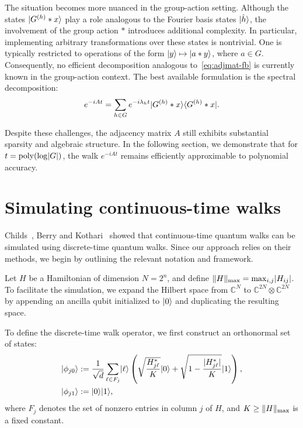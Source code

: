 \documentclass[12pt]{report}
\begin{document}
The situation becomes more nuanced in the group-action setting. Although the states \( \lvert G^{(h)} * x\rangle \) play a role analogous to the Fourier basis states \( \lvert\hat{h}\rangle \), the involvement of the group action \( * \) introduces additional complexity. In particular, implementing arbitrary transformations over these states is nontrivial. One is typically restricted to operations of the form \( \lvert y\rangle \mapsto \lvert a * y\rangle \), where \( a \in G \). Consequently, no efficient decomposition analogous to~\eqref{eq:adjmat-fb} is currently known in the group-action context. The best available formulation is the spectral decomposition:
\[
e^{-iAt} = \sum_{h \in G} e^{-i\lambda_h t} \lvert G^{(h)} * x\rangle \langle G^{(h)} * x\rvert.
\]

Despite these challenges, the adjacency matrix \( A \) still exhibits substantial sparsity and algebraic structure. In the following section, we demonstrate that for \( t = \operatorname{poly}(\log \lvert G\rvert) \), the walk \( e^{-iAt} \) remains efficiently approximable to polynomial accuracy.




\section{Simulating continuous-time walks}
Childs~\cite{Childs2004}, Berry and Kothari~\cite{BerryKothari} showed that continuous-time quantum walks can be simulated using discrete-time quantum walks. Since our approach relies on their methods, we begin by outlining the relevant notation and framework.

Let \( H \) be a Hamiltonian of dimension \( N = 2^n \), and define \( \lVert H\rVert_{\mathrm{max}} = \max_{i, j} \lvert H_{ij}\rvert \). To facilitate the simulation, we expand the Hilbert space from \( \mathbb{C}^N \) to \( \mathbb{C}^{2N} \otimes \mathbb{C}^{2N} \) by appending an ancilla qubit initialized to \( \lvert0\rangle \) and duplicating the resulting space.

To define the discrete-time walk operator, we first construct an orthonormal set of states:
\begin{align}
    \lvert\phi_{j0}\rangle & := \frac{1}{\sqrt{d}} \sum_{\ell \in F_j} \lvert\ell\rangle \left( \sqrt{\frac{H_{j\ell}^*}{K}} \lvert0\rangle + \sqrt{1 - \frac{\lvert H_{j\ell}^*\rvert}{K}} \lvert1\rangle \right), \label{eq:walk-sim} \\
    \lvert\phi_{j1}\rangle & := \lvert0\rangle \lvert1\rangle, \nonumber
\end{align}
where \( F_j \) denotes the set of nonzero entries in column \( j \) of \( H \), and \( K \ge \lVert H\rVert_{\mathrm{max}} \) is a fixed constant.
\end{document}
